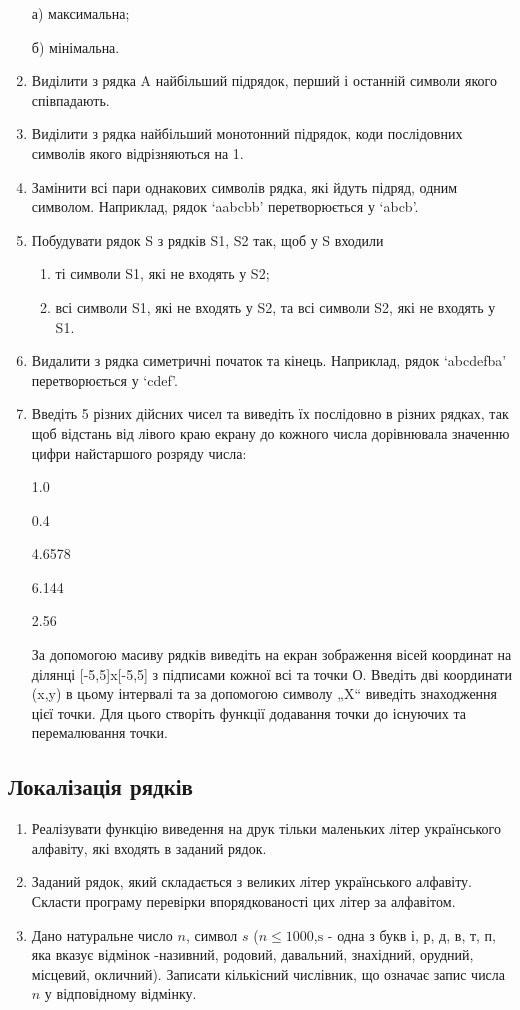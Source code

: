 \documentclass[]{article}
\makeatletter
\newcommand{\xslalph}[1]{\expandafter\@xslalph\csname c@#1\endcsname}
\newcommand{\@xslalph}[1]{%
    \ifcase#1\or а\or б\or в\or г\or д\or e\or є\or ж\or з\or i%
    \or й\or к\or л\or м\or н\or о\or п\or р\or с\or т%
    \or у\or ф\or х\or ц\or ч\or ш\or ю\or я\or аа\or бб\or вв %
    \else\@ctrerr\fi%
}
\makeatother
\begin{document}
\begin{enumerate}
а) максимальна;

б) мінімальна.
\item
Виділити з рядка A найбільший підрядок, перший і останній символи якого
співпадають.
\item
Виділити з рядка найбільший монотонний підрядок, коди послідовних
символів якого відрізняються на 1.
\item
Замінити всі пари однакових символів рядка, які йдуть підряд, одним
символом. Наприклад, рядок `aabcbb' перетворюється у `abcb'.
\item
Побудувати рядок S з рядків S1, S2 так, щоб у S входили
\begin{enumerate}[label=\xslalph*)]
\item
 ті символи S1, які не входять у S2;

\item всі символи S1, які не входять у S2, та всі символи S2, які не
входять у S1.
\end{enumerate}
\item
Видалити з рядка симетричні початок та кінець. Наприклад, рядок
`abcdefba' перетворюється у `cdef'.

\item
Введіть 5 різних дійсних чисел та виведіть їх послідовно в різних
рядках, так щоб відстань від лівого краю екрану до кожного числа
дорівнювала значенню цифри найстаршого розряду числа:

1.0

0.4

4.6578

6.144

2.56

За допомогою масиву рядків виведіть на екран зображення вісей координат
на ділянці {[}-5,5{]}x{[}-5,5{]} з підписами кожної всі та точки О.
Введіть дві координати (x,y) в цьому інтервалі та за допомогою символу
„X`` виведіть знаходження цієї точки. Для цього створіть функції
додавання точки до існуючих та перемалювання точки.
\end{enumerate}

\subsection{ Локалізація рядків}
\begin{enumerate}
\item
Реалізувати функцію виведення на друк тільки маленьких літер
українського алфавіту, які входять в заданий рядок.
\item
Заданий рядок, який складається з великих літер українського алфавіту.
Скласти програму перевірки впорядкованості цих літер за алфавітом.
\item
Дано натуральне число \(n\), символ \(s\)
(\(n \leq 1000\),\(\text{s\ }\)- одна з букв і, р, д, в, т, п, яка
вказує відмінок -називний, родовий, давальний, знахідний, орудний,
місцевий, окличний). Записати кількісний числівник, що означає запис
числа \(n\) у відповідному відмінку.

\end{enumerate}
\end{document}
